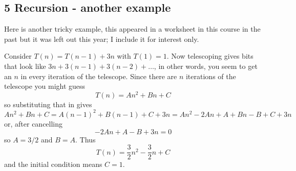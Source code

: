 \documentclass[11pt,a4paper]{scrartcl}
\begin{document}
\subsection*{5 Recursion - another example}

Here is another tricky example, this appeared in a worksheet in this course in the past but it was left out this year; I include it for interest only.

Consider $T(n)=T(n-1)+3n$ with $T(1)=1$. Now telescoping gives bits
that look like $3n+3(n-1)+3(n-2)+\ldots$, in other words, you seem to
get an $n$ in every iteration of the telescope. Since there are $n$
iterations of the telescope you might guess
\begin{equation}
T(n)=An^2+Bn+C
\end{equation}
so substituting that in gives
\begin{equation}
An^2+Bn+C=A(n-1)^2+B(n-1)+C+3n=An^2-2An+A+Bn-B+C+3n
\end{equation}
or, after cancelling
\begin{equation}
-2An+A-B+3n=0
\end{equation}
so $A=3/2$ and $B=A$. Thus
\begin{equation}
T(n)=\frac{3}{2}n^2-\frac{3}{2}n+C
\end{equation}
and the initial condition means $C=1$.
\end{document}
